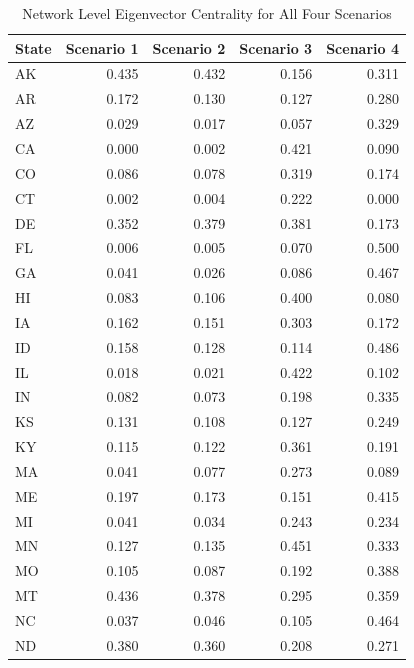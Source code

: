 \documentclass[]{article}
\begin{document}
\begin{table}[!h]

\caption{\label{tab:unnamed-chunk-80}Network Level Eigenvector Centrality for All Four Scenarios}
\centering
\begin{tabular}{l|r|r|r|r}
\hline
State & Scenario 1 & Scenario 2 & Scenario 3 & Scenario 4\\
\hline
\rowcolor{gray!6}  AK & 0.435 & 0.432 & 0.156 & 0.311\\
\hline
AR & 0.172 & 0.130 & 0.127 & 0.280\\
\hline
\rowcolor{gray!6}  AZ & 0.029 & 0.017 & 0.057 & 0.329\\
\hline
CA & 0.000 & 0.002 & 0.421 & 0.090\\
\hline
\rowcolor{gray!6}  CO & 0.086 & 0.078 & 0.319 & 0.174\\
\hline
CT & 0.002 & 0.004 & 0.222 & 0.000\\
\hline
\rowcolor{gray!6}  DE & 0.352 & 0.379 & 0.381 & 0.173\\
\hline
FL & 0.006 & 0.005 & 0.070 & 0.500\\
\hline
\rowcolor{gray!6}  GA & 0.041 & 0.026 & 0.086 & 0.467\\
\hline
HI & 0.083 & 0.106 & 0.400 & 0.080\\
\hline
\rowcolor{gray!6}  IA & 0.162 & 0.151 & 0.303 & 0.172\\
\hline
ID & 0.158 & 0.128 & 0.114 & 0.486\\
\hline
\rowcolor{gray!6}  IL & 0.018 & 0.021 & 0.422 & 0.102\\
\hline
IN & 0.082 & 0.073 & 0.198 & 0.335\\
\hline
\rowcolor{gray!6}  KS & 0.131 & 0.108 & 0.127 & 0.249\\
\hline
KY & 0.115 & 0.122 & 0.361 & 0.191\\
\hline
\rowcolor{gray!6}  MA & 0.041 & 0.077 & 0.273 & 0.089\\
\hline
ME & 0.197 & 0.173 & 0.151 & 0.415\\
\hline
\rowcolor{gray!6}  MI & 0.041 & 0.034 & 0.243 & 0.234\\
\hline
MN & 0.127 & 0.135 & 0.451 & 0.333\\
\hline
\rowcolor{gray!6}  MO & 0.105 & 0.087 & 0.192 & 0.388\\
\hline
MT & 0.436 & 0.378 & 0.295 & 0.359\\
\hline
\rowcolor{gray!6}  NC & 0.037 & 0.046 & 0.105 & 0.464\\
\hline
ND & 0.380 & 0.360 & 0.208 & 0.271\\

\end{tabular}
\end{table}
\end{document}
